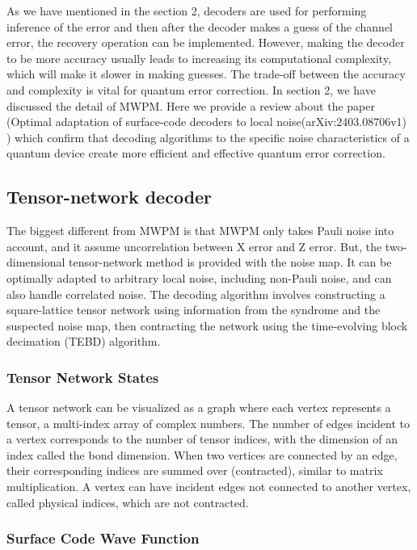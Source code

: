 As we have mentioned in the section 2, decoders are used for performing inference of the error and then after the decoder makes a guess of the channel error, the recovery operation can be implemented. However, making the decoder to be more accuracy usually leads to increasing its computational complexity, which will make it slower in making guesses. The trade-off between the accuracy and complexity is vital for quantum error correction. In section 2, we have discussed the detail of MWPM. Here we provide a review about the paper (Optimal adaptation of surface-code decoders to local noise(arXiv:2403.08706v1) ) which confirm that decoding algorithms to the specific noise characteristics of a quantum device create more efficient and effective quantum error correction.

\subsection{Tensor-network decoder}

The biggest different from MWPM is that MWPM only takes Pauli noise into account, and it assume uncorrelation between X error and Z error. But, the two-dimensional tensor-network method is provided with the noise map. It can be optimally adapted to arbitrary local noise, including non-Pauli noise, and can also handle correlated noise. The decoding algorithm involves constructing a square-lattice tensor network using information from the syndrome and the suspected noise map, then contracting the network using the time-evolving block decimation (TEBD) algorithm.

\subsubsection{Tensor Network States}

A tensor network can be visualized as a graph where each vertex represents a tensor, a multi-index array of complex numbers. The number of edges incident to a vertex corresponds to the number of tensor indices, with the dimension of an index called the bond dimension. When two vertices are connected by an edge, their corresponding indices are summed over (contracted), similar to matrix multiplication. A vertex can have incident edges not connected to another vertex, called physical indices, which are not contracted.

\subsubsection{Surface Code Wave Function}

